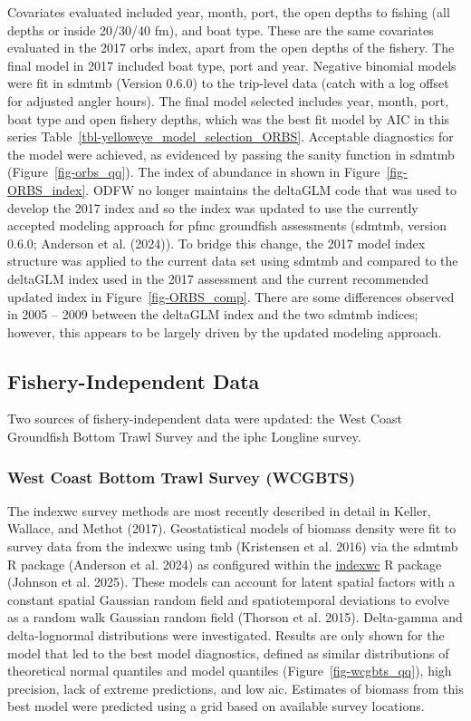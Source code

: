 \documentclass[
]{scrartcl}
\begin{document}
Covariates evaluated included year, month, port, the open depths to
fishing (all depths or inside 20/30/40 fm), and boat type. These are the
same covariates evaluated in the 2017 \gls{orbs} index, apart from the
open depths of the fishery. The final model in 2017 included boat type,
port and year. Negative binomial models were fit in \gls{sdmtmb}
(Version 0.6.0) to the trip-level data (catch with a log offset for
adjusted angler hours). The final model selected includes year, month,
port, boat type and open fishery depths, which was the best fit model by
AIC in this series Table~\ref{tbl-yelloweye_model_selection_ORBS}.
Acceptable diagnostics for the model were achieved, as evidenced by
passing the sanity function in \gls{sdmtmb} (Figure~\ref{fig-orbs_qq}).
The index of abundance in shown in Figure~\ref{fig-ORBS_index}. ODFW no
longer maintains the deltaGLM code that was used to develop the 2017
index and so the index was updated to use the currently accepted
modeling approach for \gls{pfmc} groundfish assessments (\gls{sdmtmb},
version 0.6.0; Anderson et al. (2024)). To bridge this change, the 2017
model index structure was applied to the current data set using
\gls{sdmtmb} and compared to the deltaGLM index used in the 2017
assessment and the current recommended updated index in
Figure~\ref{fig-ORBS_comp}. There are some differences observed in 2005
-- 2009 between the deltaGLM index and the two \gls{sdmtmb} indices;
however, this appears to be largely driven by the updated modeling
approach.

\subsection{Fishery-Independent Data}\label{fishery-independent-data}

Two sources of fishery-independent data were updated: the West Coast
Groundfish Bottom Trawl Survey and the \gls{iphc} Longline survey.

\subsubsection{West Coast Bottom Trawl Survey
(WCGBTS)}\label{west-coast-bottom-trawl-survey-wcgbts}

The \gls{indexwc} survey methods are most recently described in detail
in Keller, Wallace, and Methot (2017). Geostatistical models of biomass
density were fit to survey data from the \gls{indexwc} using \gls{tmb}
(Kristensen et al. 2016) via the \gls{sdmtmb} R package (Anderson et al.
2024) as configured within the
\href{https://github.com/pfmc-assessments/indexwc}{indexwc} R package
(Johnson et al. 2025). These models can account for latent spatial
factors with a constant spatial Gaussian random field and spatiotemporal
deviations to evolve as a random walk Gaussian random field (Thorson et
al. 2015). Delta-gamma and delta-lognormal distributions were
investigated. Results are only shown for the model that led to the best
model diagnostics, defined as similar distributions of theoretical
normal quantiles and model quantiles (Figure~\ref{fig-wcgbts_qq}), high
precision, lack of extreme predictions, and low \gls{aic}. Estimates of
biomass from this best model were predicted using a grid based on
available survey locations.
\end{document}
